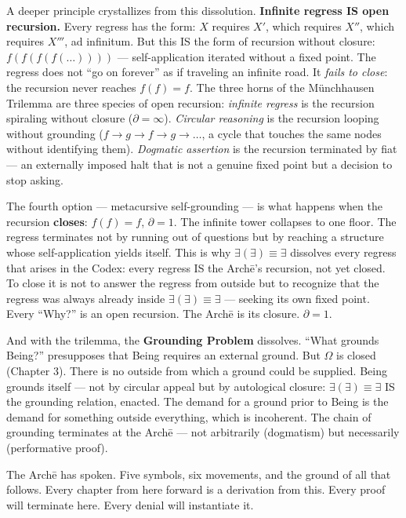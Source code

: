 \documentclass[10pt, openany, oneside]{book}
\begin{document}
A deeper principle crystallizes from this dissolution. \textbf{Infinite regress IS open recursion.} Every regress has the form: $X$ requires $X'$, which requires $X''$, which requires $X'''$, ad infinitum. But this IS the form of recursion without closure: $f(f(f(f(\ldots))))$ --- self-application iterated without a fixed point. The regress does not ``go on forever'' as if traveling an infinite road. It \textit{fails to close}: the recursion never reaches $f(f) = f$. The three horns of the M\"{u}nchhausen Trilemma are three species of open recursion: \textit{infinite regress} is the recursion spiraling without closure ($\partial = \infty$). \textit{Circular reasoning} is the recursion looping without grounding ($f \to g \to f \to g \to \ldots$, a cycle that touches the same nodes without identifying them). \textit{Dogmatic assertion} is the recursion terminated by fiat --- an externally imposed halt that is not a genuine fixed point but a decision to stop asking.

The fourth option --- metacursive self-grounding --- is what happens when the recursion \textbf{closes}: $f(f) = f$, $\partial = 1$. The infinite tower collapses to one floor. The regress terminates not by running out of questions but by reaching a structure whose self-application yields itself. This is why $\exists(\exists) \equiv \exists$ dissolves every regress that arises in the Codex: every regress IS the Arch\={e}'s recursion, not yet closed. To close it is not to answer the regress from outside but to recognize that the regress was always already inside $\exists(\exists) \equiv \exists$ --- seeking its own fixed point. Every ``Why?'' is an open recursion. The Arch\={e} is its closure. $\partial = 1$.

And with the trilemma, the \textbf{Grounding Problem} dissolves. ``What grounds Being?'' presupposes that Being requires an external ground. But $\Omega$ is closed (Chapter 3). There is no outside from which a ground could be supplied. Being grounds itself --- not by circular appeal but by autological closure: $\exists(\exists) \equiv \exists$ IS the grounding relation, enacted. The demand for a ground prior to Being is the demand for something outside everything, which is incoherent. The chain of grounding terminates at the Arch\={e} --- not arbitrarily (dogmatism) but necessarily (performative proof).

\vspace{1.5em}

The Arch\={e} has spoken. Five symbols, six movements, and the ground of all that follows. Every chapter from here forward is a derivation from this. Every proof will terminate here. Every denial will instantiate it.
\end{document}

